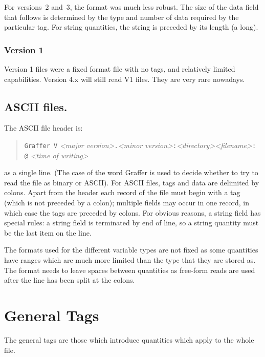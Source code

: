 \documentclass[english]{article}
\begin{document}
For versions~2 and~3, the format was much less robust.
The size of the data field that follows is determined by the
type and number of data required by the particular tag. For string quantities,
the string is preceded by its length (a long).

\subsubsection{Version 1}
\label{sec:vers1}

Version 1 files were a fixed format file with no tags, and relatively
limited capabilities. Version 4.x will still read V1 files. They are
very rare nowadays.

\subsection{ASCII files.}

The ASCII file header is:
\begin{quote}
  \texttt{Graffer V} \emph{<major version>}\texttt{.}\emph{<minor
    version>}\texttt{:}\emph{<directory><filename>}\texttt{: @}
  \emph{<time of writing>}
\end{quote}
as a single line. (The case of the word Graffer is used to decide
whether to try to read the file as binary or ASCII).
For ASCII files, tags and data are delimited by colons. Apart from
the header each record of the file must begin with a tag (which is
not preceded by a colon); multiple fields may occur in one record,
in which case the tags are preceded by colons. For obvious reasons,
a string field has special rules: a string field is terminated by
end of line, so a string quantity must be the last item on the line.


The formats used for the different variable types are not fixed as
some quantities have ranges which are much more limited than the type
that they are stored as. The format needs to leave spaces between quantities
as free-form reads are used after the line has been split at the colons.


\section{General Tags}

The general tags are those which introduce quantities which apply
to the whole file.
\end{document}
